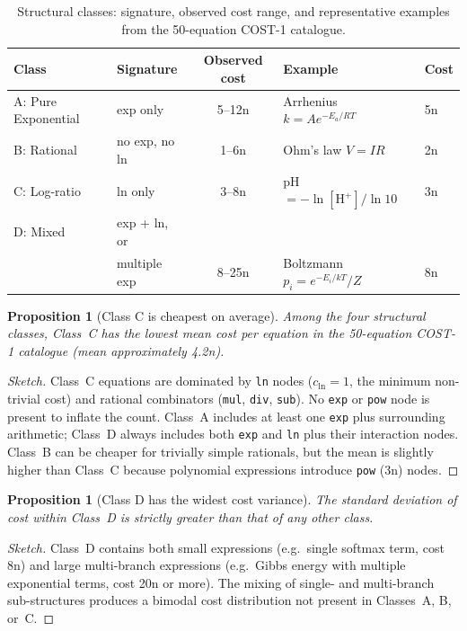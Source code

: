 \documentclass[12pt,a4paper]{article}
\newtheorem{proposition}[theorem]{Proposition}
\theoremstyle{definition}
\begin{document}
\begin{table}[h]
\centering
\caption{Structural classes: signature, observed cost range, and representative
         examples from the 50-equation COST-1 catalogue.}
\label{tab:classes}
\smallskip
\begin{tabular}{@{}llcll@{}}
\toprule
\textbf{Class} & \textbf{Signature} & \textbf{Observed cost} &
  \textbf{Example} & \textbf{Cost} \\
\midrule
A: Pure Exponential
  & exp only
  & 5--12n
  & Arrhenius $k = Ae^{-E_a/RT}$
  & 5n \\[4pt]
B: Rational
  & no exp, no ln
  & 1--6n
  & Ohm's law $V = IR$
  & 2n \\[4pt]
C: Log-ratio
  & ln only
  & 3--8n
  & pH $= -\ln[\mathrm{H}^+]/\ln 10$
  & 3n \\[4pt]
D: Mixed
  & exp + ln, or\\
  & multiple exp
  & 8--25n
  & Boltzmann $p_i = e^{-E_i/kT}/Z$
  & 8n \\
\bottomrule
\end{tabular}
\end{table}

\begin{proposition}[Class C is cheapest on average]
\label{prop:classC}
Among the four structural classes, Class~C has the lowest mean cost per
equation in the 50-equation COST-1 catalogue (mean approximately 4.2n).
\end{proposition}

\begin{proof}[Sketch]
Class~C equations are dominated by \texttt{ln} nodes ($c_{\ln} = 1$, the
minimum non-trivial cost) and rational combinators (\texttt{mul}, \texttt{div},
\texttt{sub}).  No \texttt{exp} or \texttt{pow} node is present to inflate the
count.  Class~A includes at least one \texttt{exp} plus surrounding arithmetic;
Class~D always includes both \texttt{exp} and \texttt{ln} plus their interaction
nodes.  Class~B can be cheaper for trivially simple rationals, but the mean is
slightly higher than Class~C because polynomial expressions introduce
\texttt{pow} (3n) nodes.
\end{proof}

\begin{proposition}[Class D has the widest cost variance]
\label{prop:classD}
The standard deviation of cost within Class~D is strictly greater than that of
any other class.
\end{proposition}

\begin{proof}[Sketch]
Class~D contains both small expressions (e.g.\ single softmax term, cost 8n)
and large multi-branch expressions (e.g.\ Gibbs energy with multiple
exponential terms, cost 20n or more).  The mixing of single- and multi-branch
sub-structures produces a bimodal cost distribution not present in Classes~A,
B, or~C.
\end{proof}
\end{document}
